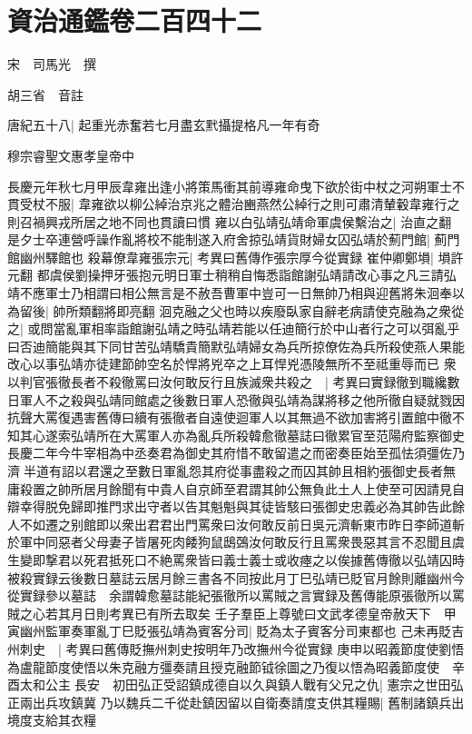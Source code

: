 \chapter{資治通鑑卷二百四十二}
宋　司馬光　撰

胡三省　音註

唐紀五十八|{
	起重光赤奮若七月盡玄黓攝提格凡一年有奇}


穆宗睿聖文惠孝皇帝中

長慶元年秋七月甲辰韋雍出逢小將策馬衝其前導雍命曳下欲於街中杖之河朔軍士不貫受杖不服|{
	韋雍欲以柳公綽治京兆之體治豳燕然公綽行之則可肅清輦轂韋雍行之則召禍興戎所居之地不同也貫讀曰慣}
雍以白弘靖弘靖命軍虞侯繫治之|{
	治直之翻}
是夕士卒連營呼譟作亂將校不能制遂入府舍掠弘靖貨財婦女囚弘靖於薊門館|{
	薊門館幽州驛館也}
殺幕僚韋雍張宗元|{
	考異曰舊傳作張宗厚今從實録}
崔仲卿鄭塤|{
	塤許元翻}
都虞侯劉操押牙張抱元明日軍士稍稍自悔悉詣館謝弘靖請改心事之凡三請弘靖不應軍士乃相謂曰相公無言是不赦吾曹軍中豈可一日無帥乃相與迎舊將朱洄奉以為留後|{
	帥所類翻將即亮翻}
洄克融之父也時以疾廢臥家自辭老病請使克融為之衆從之|{
	或問當亂軍相率詣館謝弘靖之時弘靖若能以任迪簡行於中山者行之可以弭亂乎曰否迪簡能與其下同甘苦弘靖驕貴簡默弘靖婦女為兵所掠僚佐為兵所殺使燕人果能改心以事弘靖亦徒建節帥空名於悍將兇卒之上耳悍兇憑陵無所不至祗重辱而已}
衆以判官張徹長者不殺徹罵曰汝何敢反行且族滅衆共殺之　|{
	考異曰實録徹到職纔數日軍人不之殺與弘靖同館處之後數日軍人恐徹與弘靖為謀將移之他所徹自疑就戮因抗聲大罵復遇害舊傳曰續有張徹者自遠使迴軍人以其無過不欲加害將引置館中徹不知其心遂索弘靖所在大罵軍人亦為亂兵所殺韓愈徹墓誌曰徹累官至范陽府監察御史長慶二年今牛宰相為中丞奏君為御史其府惜不敢留遣之而密奏臣始至孤怯須彊佐乃濟半道有詔以君還之至數日軍亂怨其府從事盡殺之而囚其帥且相約張御史長者無庸殺置之帥所居月餘聞有中貴人自京師至君謂其帥公無負此土人上使至可因請見自辯幸得脱免歸即推門求出守者以告其魁魁與其徒皆駭曰張御史忠義必為其帥告此餘人不如遷之别館即以衆出君君出門罵衆曰汝何敢反前日吳元濟斬東市昨日李師道斬於軍中同惡者父母妻子皆屠死肉餧狗鼠鴟鵶汝何敢反行且罵衆畏惡其言不忍聞且虞生變即撃君以死君抵死口不絶罵衆皆曰義士義士或收瘞之以俟據舊傳徹以弘靖囚時被殺實録云後數日墓誌云居月餘三書各不同按此月丁巳弘靖已貶官月餘則離幽州今從實録參以墓誌　余謂韓愈墓誌能紀張徹所以罵賊之言實録及舊傳能原張徹所以罵賊之心若其月日則考異已有所去取矣}
壬子羣臣上尊號曰文武孝德皇帝赦天下　甲寅幽州監軍奏軍亂丁巳貶張弘靖為賓客分司|{
	貶為太子賓客分司東都也}
己未再貶吉州刺史　|{
	考異曰舊傳貶撫州刺史按明年乃改撫州今從實録}
庚申以昭義節度使劉悟為盧龍節度使悟以朱克融方彊奏請且授克融節钺徐圖之乃復以悟為昭義節度使　辛酉太和公主長安　初田弘正受詔鎮成德自以久與鎮人戰有父兄之仇|{
	憲宗之世田弘正兩出兵攻鎮冀}
乃以魏兵二千從赴鎮因留以自衛奏請度支供其糧賜|{
	舊制諸鎮兵出境度支給其衣糧}
